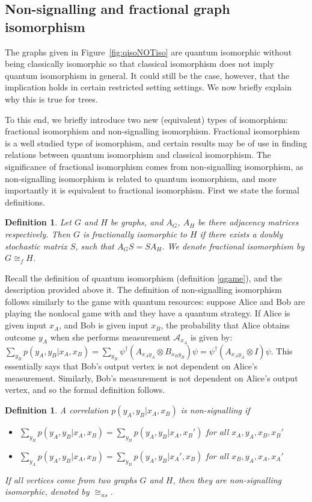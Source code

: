 \documentclass[12pt]{article}
\newtheorem{defn}[thm]{Definition}
\begin{document}
\subsection{Non-signalling and fractional graph isomorphism}

The graphs given in Figure~\ref{fig:qisoNOTiso} are quantum isomorphic
without being classically isomorphic so that classical isomorphism
does not imply quantum isomorphism in general. It could still be the
case, however, that the implication holds in certain restricted
setting settings. We now briefly explain why this is true for trees.

To this end, we briefly introduce two new (equivalent) types of
isomorphism: fractional isomorphism and non-signalling
isomorphism. Fractional isomorphism is a well studied type of
isomorphism, and certain results may be of use in finding relations
between quantum isomorphism and classical isomorphism. The
significance of fractional isomorphism comes from non-signalling
isomorphism, as non-signalling isomorphism is related to quantum
isomorphism, and more importantly it is equivalent to fractional
isomorphism. First we state the formal definitions.

\begin{defn}
  Let $G$ and $H$ be graphs, and $A_G$, $A_H$ be there adjacency
  matrices respectively. Then $G$ is fractionally isomorphic to $H$ if
  there exists a doubly stochastic matrix $S$, such that $A_GS =
  SA_H$. We denote fractional isomorphism by $G \cong_f H$.
\end{defn}

Recall the definition of quantum isomorphism (definition \ref{qgame}),
and the description provided above it. The definition of
non-signalling isomorphism follows similarly to the game with quantum
resources: suppose Alice and Bob are playing the nonlocal game with
and they have a quantum strategy. If Alice is given input $x_A$, and
Bob is given input $x_B$, the probability that Alice obtains outcome
$y_A$ when she performs measurement $\mathcal{A}_{x_A}$ is given by:
$\sum_{y_B}p(y_A, y_B | x_A, x_B) =
\sum_{y_B}\psi^\dag(A_{x_Ay_A}\otimes B_{x_By_B})\psi =
\psi^\dag(A_{x_Ay_A}\otimes I)\psi$. This essentially says that Bob's
output vertex is not dependent on Alice's measurement. Similarly,
Bob's measurement is not dependent on Alice's output vertex, and so
the formal definition follows.

\begin{defn}
  A correlation $p(y_A, y_B | x_A, x_B)$ is non-signalling if
  \begin{itemize}
  \item $\sum_{y_B}p(y_A, y_B | x_A, x_B) = \sum_{y_B}p(y_A, y_B |
    x_A, x_B')$ for all $x_A, y_A, x_B, x_B'$
  \item $\sum_{y_A}p(y_A, y_B | x_A, x_B) = \sum_{y_B}p(y_A, y_B |
    x_A', x_B)$ for all $x_B, y_A, x_A, x_A'$
  \end{itemize}
  If all vertices come from two graphs $G$ and $H$, then they are
  non-signalling isomorphic, denoted by $\cong_{ns}$.
\end{defn}
\end{document}

